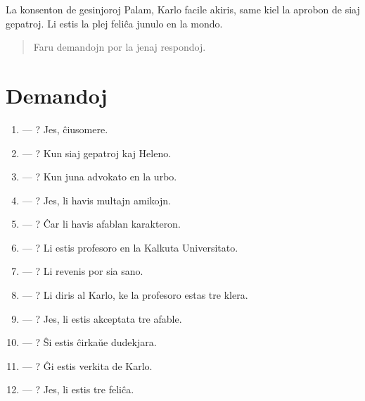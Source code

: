La konsenton de gesinjoroj Palam, Karlo facile akiris, same kiel la aprobon de siaj gepatroj. Li estis la plej feliĉa junulo en la mondo.

\begin{quotation}
    Faru demandojn por la jenaj respondoj.
\end{quotation}

\newpage

\section*{Demandoj}

\begin{enumerate}
    \item  — ? Jes, ĉiusomere.
    \item  — ? Kun siaj gepatroj kaj Heleno.
    \item  — ? Kun juna advokato en la urbo.
    \item  — ? Jes, li havis multajn amikojn.
    \item  — ? Ĉar li havis afablan karakteron.
    \item  — ? Li estis profesoro en la Kalkuta Universitato.
    \item  — ? Li revenis por sia sano.
    \item  — ? Li diris al Karlo, ke la profesoro estas tre klera.
    \item  — ? Jes, li estis akceptata tre afable.
    \item  — ? Ŝi estis ĉirkaŭe dudekjara.
    \item  — ? Ĝi estis verkita de Karlo.
    \item  — ? Jes, li estis tre feliĉa.
\end{enumerate}
